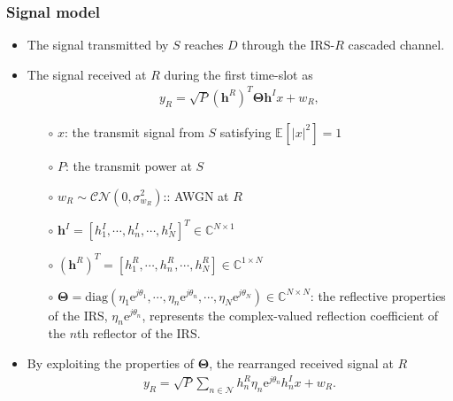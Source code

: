 \documentclass[article,mathserif,10pt,envcountsect]{beamer}
\newcommand{\E}[2][]{\mathbb{E}_{#1}\!\left[{#2}\right]}
\renewcommand{\exp}[1]{\mathrm{e}^{#1}}
\newcommand{\diag}[1]{\mathrm{diag}\left(#1\right)}
\begin{document}
\begin{frame}
	\frametitle{Signal model}
	\begin{itemize}
		\item  The signal transmitted  by $S$ reaches $D$ through the IRS-$R$ cascaded channel. 
		\item The  signal received at $R$ during the first time-slot as 
		\begin{eqnarray}\label{eqn:R_rx_signl}
		y_R =\sqrt{P}  (\mathbf{h}^R)^T \mathbf \Theta \mathbf{h}^I  x + w_R, \nonumber
		\end{eqnarray}

	\begin{itemize}
		\item[$\circ$] $x$: the transmit signal from $S$ satisfying $\E{|x|^2} =1$
		\item[$\circ$] $P$: the  transmit power at $S$
		\item[$\circ$] $w_R \sim \mathcal{CN}\left(0,\sigma_{w_R}^2\right)$:: AWGN at $R$
		\item[$\circ$] $\mathbf{h}^I=[h_1^I,\cdots,h_n^I,\cdots,h_N^I]^T \in \mathbb C^{N\times 1}$ 
		\item[$\circ$] $(\mathbf{h}^R)^T=[h_1^R,\cdots,h_n^R,\cdots,h_N^R] \in \mathbb C^{1\times N}$
		\item[$\circ$]  $\mathbf \Theta = \diag{\eta_{1} \exp{j\theta_{1}}, \cdots, \eta_{n} \exp{j\theta_{n}}, \cdots, \eta_{N} \exp{j\theta_{N}}} \in \mathbb C^{N\times N}$: the reflective properties of the IRS, $\eta_{n} \exp{j\theta_{n}}$, represents the complex-valued reflection coefficient of the $n$th reflector of the IRS. 
	\end{itemize}
	
	
	\item By exploiting the properties of $\mathbf \Theta$,  the rearranged received signal  at $R$
	\begin{eqnarray}\label{eqn:R_rx_signl_rearng}
	y_R =  \sqrt{P} \sum\nolimits_{n \in{\mathcal{N}}}  h_{n}^R  \eta_{n} \exp{j \theta_{n}} h_{n}^I x + w_R. \nonumber
	\end{eqnarray}


	\end{itemize}

\end{frame}	
\end{document}
